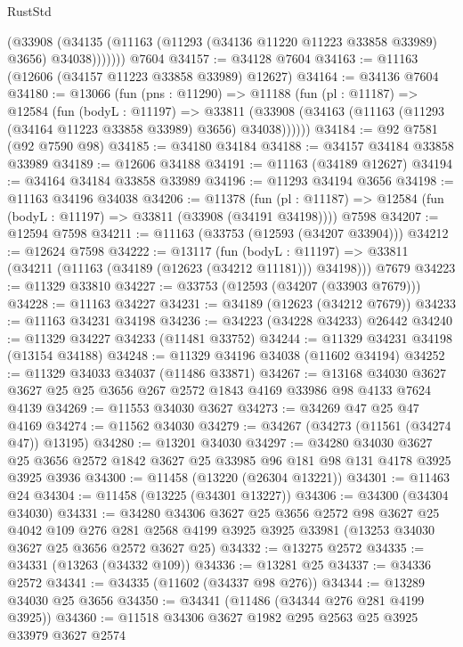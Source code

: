 \begin{lexlean}{RustStd}
\begin{coremodule}
            (@33908
              (@34135 (@11163 (@11293 (@34136 @11220 @11223 @33858 @33989) @3656) @34038)))))))
    @7604
@34157 := @34128 @7604
@34163 := @11163 (@12606 (@34157 @11223 @33858 @33989) @12627)
@34164 := @34136 @7604
@34180 := @13066
    (fun (pns : @11290) =>
    @11188
      (fun (pl : @11187) =>
      @12584
        (fun (bodyL : @11197) =>
        @33811 (@33908 (@34163 (@11163 (@11293 (@34164 @11223 @33858 @33989) @3656) @34038))))))
@34184 := @92 @7581 (@92 @7590 @98)
@34185 := @34180 @34184
@34188 := @34157 @34184 @33858 @33989
@34189 := @12606 @34188
@34191 := @11163 (@34189 @12627)
@34194 := @34164 @34184 @33858 @33989
@34196 := @11293 @34194 @3656
@34198 := @11163 @34196 @34038
@34206 := @11378
    (fun (pl : @11187) => @12584 (fun (bodyL : @11197) => @33811 (@33908 (@34191 @34198))))
    @7598
@34207 := @12594 @7598
@34211 := @11163 (@33753 (@12593 (@34207 @33904)))
@34212 := @12624 @7598
@34222 := @13117
    (fun (bodyL : @11197) => @33811 (@34211 (@11163 (@34189 (@12623 (@34212 @11181))) @34198)))
    @7679
@34223 := @11329 @33810
@34227 := @33753 (@12593 (@34207 (@33903 @7679)))
@34228 := @11163 @34227
@34231 := @34189 (@12623 (@34212 @7679))
@34233 := @11163 @34231 @34198
@34236 := @34223 (@34228 @34233) @26442
@34240 := @11329 @34227 @34233 (@11481 @33752)
@34244 := @11329 @34231 @34198 (@13154 @34188)
@34248 := @11329 @34196 @34038 (@11602 @34194)
@34252 := @11329 @34033 @34037 (@11486 @33871)
@34267 := @13168
    @34030
    @3627
    @3627
    @25
    @25
    @3656
    @267
    @2572
    @1843
    @4169
    @33986
    @98
    @4133
    @7624
    @4139
@34269 := @11553 @34030 @3627
@34273 := @34269 @47 @25 @47 @4169
@34274 := @11562 @34030
@34279 := @34267 (@34273 (@11561 (@34274 @47)) @13195)
@34280 := @13201 @34030
@34297 := @34280
    @34030
    @3627
    @25
    @3656
    @2572
    @1842
    @3627
    @25
    @33985
    @96
    @181
    @98
    @131
    @4178
    @3925
    @3925
    @3936
@34300 := @11458 (@13220 (@26304 @13221))
@34301 := @11463 @24
@34304 := @11458 (@13225 (@34301 @13227))
@34306 := @34300 (@34304 @34030)
@34331 := @34280
    @34306
    @3627
    @25
    @3656
    @2572
    @98
    @3627
    @25
    @4042
    @109
    @276
    @281
    @2568
    @4199
    @3925
    @3925
    @33981
    (@13253 @34030 @3627 @25 @3656 @2572 @3627 @25)
@34332 := @13275 @2572
@34335 := @34331 (@13263 (@34332 @109))
@34336 := @13281 @25
@34337 := @34336 @2572
@34341 := @34335 (@11602 (@34337 @98 @276))
@34344 := @13289 @34030 @25 @3656
@34350 := @34341 (@11486 (@34344 @276 @281 @4199 @3925))
@34360 := @11518 @34306 @3627 @1982 @295 @2563 @25 @3925 @33979 @3627 @2574

\end{coremodule}
\end{lexlean}
